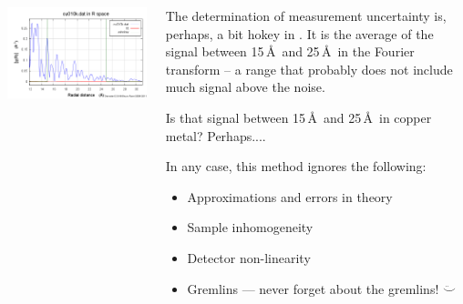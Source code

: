 \documentclass[10pt, xcolor=x11names, compress]{beamer}
\begin{document}
\begin{frame}
\begin{columns}
\begin{column}{0.3\linewidth}
      \includegraphics[width=\linewidth]{info/cu_chir12_31.png}      
    \end{column}
    \begin{column}{0.7\linewidth}
      The determination of measurement uncertainty is, perhaps, a bit
      hokey in {\artemis}.  It is the average of the signal between
      15\,\AA\ and 25\,\AA\ in the Fourier transform -- a range that
      probably does not include much signal above the noise.

      \bigskip

      Is that signal between 15\,\AA\ and 25\,\AA\ in copper metal?
      Perhaps....

      \bigskip

      In any case, this method ignores the following:
      \begin{itemize}
      \item Approximations and errors in theory
      \item Sample inhomogeneity
      \item Detector non-linearity
      \item Gremlins --- never forget about the gremlins! $\ddot\smile$
      \end{itemize}
    \end{column}
  \end{columns}
\end{frame}
\end{document}
